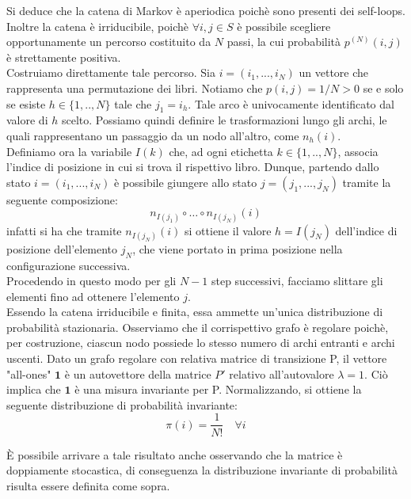 \documentclass[
	12pt, %
]{fphw}
\begin{document}
Si deduce che la catena di Markov è aperiodica poichè sono presenti dei self-loops.\\
Inoltre la catena è irriducibile, poichè $ \forall i,j \in S$ è possibile scegliere opportunamente un percorso costituito da $N$ passi, la cui probabilità $p^{(N)}(i,j)$ è strettamente positiva.\\
Costruiamo direttamente tale percorso.
Sia $i = (i_1, ... , i_N)$ un vettore che rappresenta una permutazione dei libri.
Notiamo che $p(i,j)=1/N>0$ se e solo se esiste $h\in \{1,..,N\}$ tale che $j_1 = i_h$.
Tale arco è univocamente identificato dal valore di $h$ scelto.
Possiamo quindi definire le trasformazioni lungo gli archi, le quali rappresentano un passaggio da un nodo all'altro, come $n_h(i)$.\\
Definiamo ora la variabile $I(k)$ che, ad ogni etichetta $k \in \{1,..,N\}$, associa l'indice di posizione in cui si trova il rispettivo libro.
Dunque, partendo dallo stato $i = (i_1, ... , i_N)$ è possibile giungere allo stato $j = (j_1, ... , j_N)$ tramite la seguente composizione:
\begin{equation}
	n_{I(j_1)} \circ \dots \circ n_{I(j_N)} (i)
\end{equation}
infatti si ha che tramite $n_{I(j_N)} (i)$ si ottiene il valore $h = I(j_N)$ dell'indice di posizione dell'elemento $j_N$, che viene portato in prima posizione nella configurazione successiva.\\
Procedendo in questo modo per gli $N-1$ step successivi, facciamo slittare gli elementi fino ad ottenere l'elemento $j$.\\
Essendo la catena irriducibile e finita, essa ammette un'unica distribuzione di probabilità stazionaria.
Osserviamo che il corrispettivo grafo è regolare poichè, per costruzione, ciascun nodo possiede lo stesso numero di archi entranti e archi uscenti.
Dato un grafo regolare con relativa matrice di transizione P, il vettore "all-ones" $\mathbf{1}$ è un autovettore della matrice $P'$ relativo all'autovalore $\lambda = 1$.
Ciò implica che $\mathbf{1}$ è una misura invariante per P. Normalizzando, si ottiene la seguente distribuzione di probabilità invariante:
\begin{equation*}
	\pi(i) = \frac{1}{N!} \quad \forall i
\end{equation*}
	
\MakeUppercase{è} possibile arrivare a tale risultato anche osservando che la matrice è doppiamente stocastica, di conseguenza la distribuzione invariante di probabilità risulta essere definita come sopra.



\end{document}

